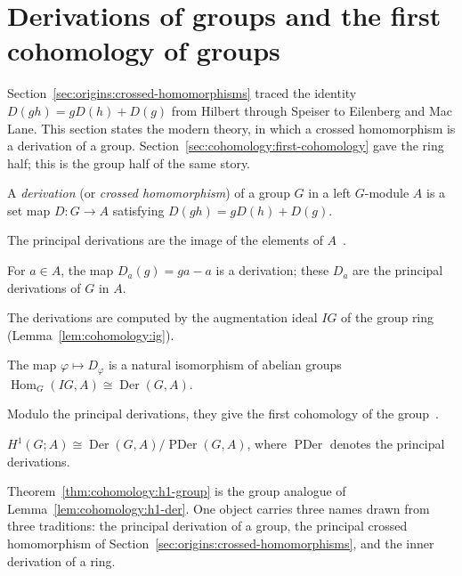 \section{Derivations of groups and the first cohomology of groups}\label{sec:cohomology:group-cohomology}

Section~\ref{sec:origins:crossed-homomorphisms} traced the identity
$D(gh) = gD(h) + D(g)$ from Hilbert through Speiser to Eilenberg and Mac Lane. This
section states the modern theory, in which a crossed homomorphism is a derivation of
a group. Section~\ref{sec:cohomology:first-cohomology} gave the ring half;
this is the group half of the same story.

\begin{definition}\label{def:cohomology:group-derivation}
A \emph{derivation} (or \emph{crossed homomorphism}) of a group $G$ in a left
$G$-module $A$ is a set map $D \colon G \to A$ satisfying
$D(gh) = gD(h) + D(g)$.
\end{definition}

The principal derivations are the image of the elements of
$A$~\cite[Example~6.4.2, p.~174]{Weibel1994}.

\begin{example}\label{ex:cohomology:principal}
For $a \in A$, the map $D_a(g) = ga - a$ is a derivation; these $D_a$ are the
principal derivations of $G$ in $A$.
\end{example}

The derivations are computed by the augmentation ideal $IG$ of the group
ring~ (Lemma~\ref{lem:cohomology:ig})\cite[Lemma~6.4.4, p.~175]{Weibel1994}.

\begin{lemma}\label{lem:cohomology:ig}
The map $\varphi \mapsto D_\varphi$ is a natural isomorphism of abelian groups
$\operatorname{Hom}_G(IG, A) \cong \operatorname{Der}(G, A)$.
\end{lemma}

Modulo the principal derivations, they give the first cohomology of the
group~\cite[Theorem~6.4.5, p.~175]{Weibel1994}.

\begin{theorem}\label{thm:cohomology:h1-group}
$H^1(G; A) \cong \operatorname{Der}(G, A)/\operatorname{PDer}(G, A)$, where
$\operatorname{PDer}$ denotes the principal derivations.
\end{theorem}

Theorem~\ref{thm:cohomology:h1-group} is the group analogue of
Lemma~\ref{lem:cohomology:h1-der}. One object carries three names drawn from three
traditions: the principal derivation of a group, the principal crossed homomorphism
of Section~\ref{sec:origins:crossed-homomorphisms}, and the inner derivation of a ring.

